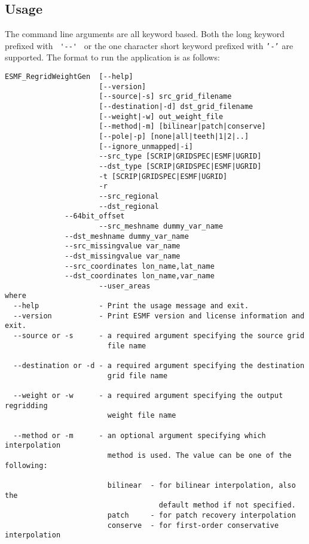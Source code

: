 \subsection{Usage}

The command line arguments are all keyword based.  Both the long keyword prefixed with \verb+ '--' + or the 
one character short keyword prefixed with {\tt '-'} are supported.  The format to run the application is 
as follows:

\begin{verbatim}
ESMF_RegridWeightGen  [--help]
                      [--version]
                      [--source|-s] src_grid_filename 
                      [--destination|-d] dst_grid_filename 
                      [--weight|-w] out_weight_file 
                      [--method|-m] [bilinear|patch|conserve] 
                      [--pole|-p] [none|all|teeth|1|2|..] 
                      [--ignore_unmapped|-i]
                      --src_type [SCRIP|GRIDSPEC|ESMF|UGRID] 
                      --dst_type [SCRIP|GRIDSPEC|ESMF|UGRID]
                      -t [SCRIP|GRIDSPEC|ESMF|UGRID]
                      -r
                      --src_regional
                      --dst_regional
		      --64bit_offset
                      --src_meshname dummy_var_name
		      --dst_meshname dummy_var_name
		      --src_missingvalue var_name
		      --dst_missingvalue var_name
		      --src_coordinates lon_name,lat_name
		      --dst_coordinates lon_name,var_name
                      --user_areas
where
  --help              - Print the usage message and exit.
  --version           - Print ESMF version and license information and exit.
  --source or -s      - a required argument specifying the source grid 
                        file name

  --destination or -d - a required argument specifying the destination 
                        grid file name

  --weight or -w      - a required argument specifying the output regridding 
                        weight file name

  --method or -m      - an optional argument specifying which interpolation 
                        method is used. The value can be one of the following:

                        bilinear  - for bilinear interpolation, also the 
                                    default method if not specified.
                        patch     - for patch recovery interpolation
                        conserve  - for first-order conservative interpolation


\end{verbatim}
